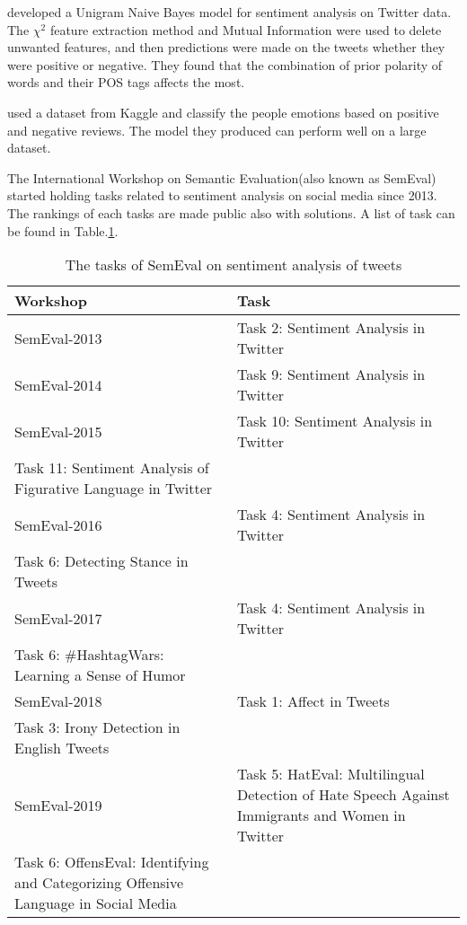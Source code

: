 \cite{opinionMiningLiang2013} developed a Unigram Naive Bayes model for
sentiment analysis on Twitter data. The $\chi^2$ feature extraction method
and Mutual Information were used to delete unwanted features, and then predictions
were made on the tweets whether they were positive or negative. They found that
the combination of prior polarity of words and their POS tags affects the most.

\cite{bhavsar2019sentiment} used a dataset from Kaggle and classify the people
emotions based on positive and negative reviews. The model they produced can
perform well on a large dataset.

The International Workshop on Semantic Evaluation(also known as SemEval)
started holding tasks related to sentiment analysis on social media since 2013.
The rankings of each tasks are made public also with solutions. A list of task
can be found in Table.\ref{table:SemEvalTasks}. %


\begin{table}[h]
  \caption{The tasks of SemEval on sentiment analysis of tweets}
  \label{table:SemEvalTasks}
  \centering
  \renewcommand{\tabularxcolumn}{m} %
  \begin{tabularx}{\textwidth}{l >{\raggedright}X}
    \toprule
    \textbf{Workshop} & \textbf{Task}
    \tabularnewline \midrule
    SemEval-2013
                      &
    Task 2: Sentiment Analysis in Twitter \citep{SemEval2013Task2}
    \tabularnewline \hline
    SemEval-2014
                      &
    Task 9: Sentiment Analysis in Twitter \citep{SemEval2014Task9}
    \tabularnewline \hline
    SemEval-2015
                      &
    Task 10: Sentiment Analysis in Twitter \citep{SemEval2015Task10} \\
    Task 11: Sentiment Analysis of Figurative Language in Twitter
    \citep{SemEval2015Task11}
    \tabularnewline \hline
    SemEval-2016
                      &
    Task 4: Sentiment Analysis in Twitter \citep{SemEval2016Task4}   \\
    Task 6: Detecting Stance in Tweets \citep{SemEval2016Task6}
    \tabularnewline \hline
    SemEval-2017
                      &
    Task 4: Sentiment Analysis in Twitter \citep{SemEval2017Task4}   \\
    Task 6: \#HashtagWars: Learning a Sense of Humor \citep{SemEval2017Task6}
    \tabularnewline \hline
    SemEval-2018
                      &
    Task 1: Affect in Tweets \citep{SemEval2018Task1}                \\
    Task 3: Irony Detection in English Tweets \citep{SemEval2018Task3}
    \tabularnewline \hline
    SemEval-2019
                      &
    Task 5: HatEval: Multilingual Detection of Hate Speech Against Immigrants
    and Women in Twitter \citep{SemEval2019Task5}                    \\
    Task 6: OffensEval: Identifying and Categorizing Offensive Language in
    Social Media \citep{SemEval2019Task6}
    \tabularnewline \bottomrule
  \end{tabularx}
\end{table}
